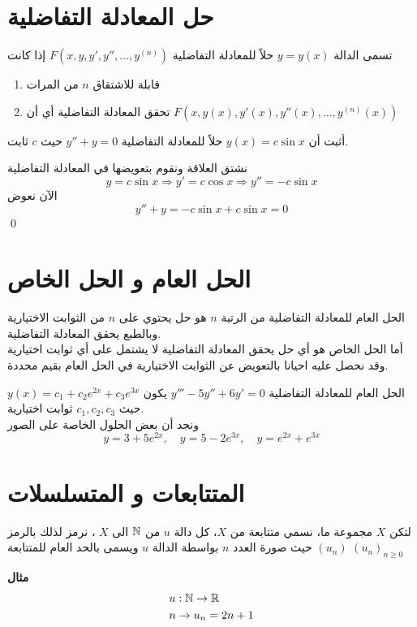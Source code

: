 \section[حل المعادلة التفاضلية]{حل المعادلة التفاضلية \cite{diff_eqs_pt1}}
تسمى الدالة $y=y(x)$ حلاً للمعادلة التفاضلية $F(x,y,y',y'',\dots,y^{(n)})$ إذا كانت
\begin{enumerate}
    \item قابلة للاشتقاق $n$ من المرات
    \item تحقق المعادلة التفاضلية أي أن $F(x,y(x),y'(x),y''(x),\dots,y^{(n)}(x))$
\end{enumerate}
\begin{example}
    أثبت أن $y(x)=c \sin x$ حلاً للمعادلة التفاضلية $y''+y=0$ حيث $c$ ثابت.
\end{example}
\begin{solution}
    نشتق العلاقة ونقوم بتعويضها في المعادلة التفاضلية
\[
y=c\sin x\Rightarrow y'=c\cos x\Rightarrow y''=-c\sin x
\]
الآن نعوض
\[
y''+y=-c\sin x+c\sin x=0
\]\qed
\end{solution}
\section[الحل العام و الحل الخاص]{الحل العام و الحل الخاص \cite{diff_eqs_pt1}}
الحل العام للمعادلة التفاضلية من الرتبة $n$ هو حل يحتوي على $n$ من الثوابت الاختيارية وبالطبع يحقق المعادلة التفاضلية.\\
أما الحل الخاص هو أي حل يحقق المعادلة التفاضلية لا يشتمل على أي ثوابت اختيارية وقد نحصل عليه احيانا بالتعويض عن الثوابت الاختيارية في الحل العام بقيم محددة.

\begin{example}
    الحل العام للمعادلة التفاضلية $y'''-5y''+6y'=0$ يكون $y(x)=c_1+c_2e^{2x}+c_3e^{3x}$ حيث $c_1,c_2,c_3$ ثوابت اختيارية.\\
    ونجد أن بعض الحلول الخاصة على الصور 
    \[
    y=3+5e^{2x},\quad y=5-2e^{3x},\quad y=e^{2x}+e^{3x}
    \]
\end{example}

\section[المتتابعات و المتسلسلات]{المتتابعات و المتسلسلات \cite{mathanal}}

\begin{definition}
	لتكن $X$ مجموعة ما، نسمي متتابعة من $X$، كل دالة $u$ من $\mathbb{N}$ الى $X$ ، نرمز لذلك بالرمز $(u_n)$ حيث صورة العدد $n$ بواسطة الدالة $u$ ويسمى بالحد العام للمتتابعة $(u_n)_{n\geq 0}$
\end{definition}
\noindent
\textbf{مثال}
\begin{align*}
&u : \mathbb{N} \to \mathbb{R}\\
&n \to u_n = 2n+1
\end{align*}

